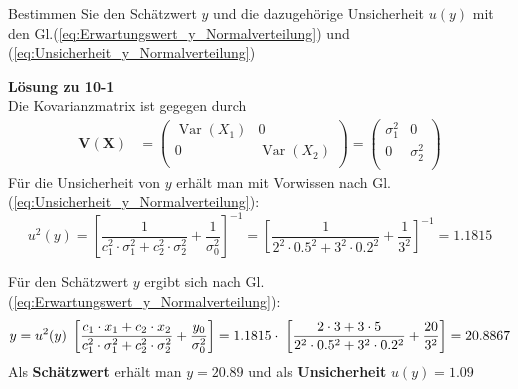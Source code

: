 Bestimmen Sie den Schätzwert $y$ und die dazugehörige Unsicherheit 
$u(y)$ mit den Gl.(\ref{eq:Erwartungswert_y_Normalverteilung}) und 
(\ref{eq:Unsicherheit_y_Normalverteilung})

\textbf{Lösung zu 10-1} \\
Die Kovarianzmatrix ist gegegen durch 
\begin{align}
\boldsymbol{V(X)} &= 
\begin{pmatrix}
\operatorname{Var}(X_1) & 0 \\
0 & \operatorname{Var}(X_2)  \\
\end{pmatrix}
= 
\begin{pmatrix}
\sigma_1^2 & 0 \\
0 & \sigma_2^2 \\
\end{pmatrix}
\end{align}
Für die Unsicherheit von $y$ erhält man mit Vorwissen nach Gl.	(\ref{eq:Unsicherheit_y_Normalverteilung}):
\[
u^2(y) = \left[ \frac{1}{c_1^2\cdot \sigma_1^2 + c_2^2\cdot \sigma_2^2} 
+ \frac{1}{\sigma_0^2} \right]^{-1}
 = \left[ \frac{1}{2^2\cdot 0.5^2 + 3^2\cdot 0.2^2} 
+ \frac{1}{3^2} \right]^{-1} = 1.1815
\]

Für den Schätzwert $y$ ergibt sich nach Gl.(\ref{eq:Erwartungswert_y_Normalverteilung}):
\[
y = u^2(y) \;\left[ \frac{\textstyle c_1\cdot x_1 + c_2\cdot x_2}
{\textstyle c_1^2 \cdot \sigma_1^2 + c_2^2\cdot \sigma_2^2} +\frac{y_0}{\sigma_0^2} \right]
 = 1.1815 \cdot \; \left[\frac{2\cdot 3 + 3\cdot 5}
{2^2 \cdot 0.5^2 + 3^2\cdot 0.2^2} + \frac{20}{3^2} \right] = 20.8867
\]
Als \textbf{Schätzwert} erhält man $y=20.89$ und als \textbf{Unsicherheit} $u(y)= 1.09 $


\begin{thebibliography}{------}
	\item[] \hspace*{5em}{\Large\bf zu Kapitel 10:}
\end{thebibliography}